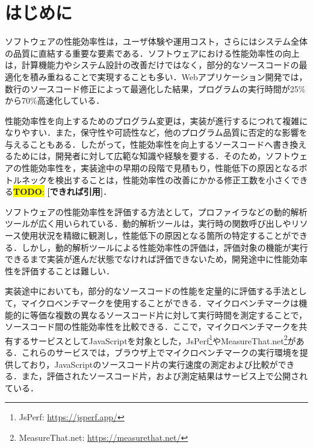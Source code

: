 \documentclass[submit,techrep,noauthor]{ipsj}
\newcommand{\todo}[1]{\colorbox{yellow}{{\bf TODO}:}{\color{red} {\textbf{[#1]}}}}
\begin{document}
\maketitle

\section{はじめに}

 ソフトウェアの性能効率性は，ユーザ体験や運用コスト，さらにはシステム全体の品質に直結する重要な要素である\cite{performance1}\cite{performance2}\cite{negative}．ソフトウェアにおける性能効率性の向上は，計算機能力やシステム設計の改善だけではなく，部分的なソースコードの最適化を積み重ねることで実現することも多い．Webアプリケーション開発では，数行のソースコード修正によって最適化した結果，プログラムの実行時間が25\%から70\%高速化している\cite{jsRefac}．

性能効率性を向上するためのプログラム変更は，実装が進行するにつれて複雑になりやすい\cite{complicate}．また，保守性や可読性など，他のプログラム品質に否定的な影響を与えることもある\cite{negative}．したがって，性能効率性を向上するソースコードへ書き換えるためには，開発者に対して広範な知識や経験を要する．そのため，ソフトウェアの性能効率性を，実装途中の早期の段階で見積もり，性能低下の原因となるボトルネックを検出することは，性能効率性の改善にかかる修正工数を小さくできる\todo{できれば引用}． 

ソフトウェアの性能効率性を評価する方法として，プロファイラなどの動的解析ツールが広く用いられている．動的解析ツールは，実行時の関数呼び出しやリソース使用状況を精緻に観測し，性能低下の原因となる箇所の特定することができる．しかし，動的解析ツールによる性能効率性の評価は，評価対象の機能が実行できるまで実装が進んだ状態でなければ評価できないため，開発途中に性能効率性を評価することは難しい．

実装途中においても，部分的なソースコードの性能を定量的に評価する手法として，マイクロベンチマークを使用することができる．マイクロベンチマークは機能的に等価な複数の異なるソースコード片に対して実行時間を測定することで，ソースコード間の性能効率性を比較できる．ここで，マイクロベンチマークを共有するサービスとしてJavaScriptを対象とした，JsPerf\footnote{JsPerf: \url{https://jsperf.app/}}やMeasureThat.net\footnote{MeasureThat.net: \url{https://measurethat.net/}}がある．これらのサービスでは，ブラウザ上でマイクロベンチマークの実行環境を提供しており，JavaScriptのソースコード片の実行速度の測定および比較ができる．また，評価されたソースコード片，および測定結果はサービス上で公開されている．
\end{document}
